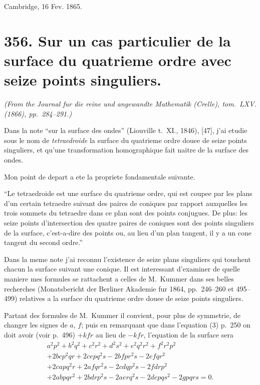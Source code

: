 \documentclass[11pt,a4paper]{article}
\theoremstyle{plain}
\begin{document}
\begin{flushright}
Cambridge, 16 Fev. 1865.
\end{flushright}

\vspace{1cm}

\section*{356. Sur un cas particulier de la surface du quatrieme ordre avec seize points singuliers.\quad [356]}
\label{sec:356}

\begin{flushright}
\textit{(From the Journal fur die reine und angewandte Mathematik (Crelle), tom.~LXV. (1866), pp.~284--291.)}
\end{flushright}

Dans la note ``sur la surface des ondes'' (Liouville t.~XI., 1846), [47], j'ai etudie sous le nom de \textit{tetraedroide} la surface du quatrieme ordre douee de seize points singuliers, et qu'une transformation homographique fait naitre de la surface des ondes.

Mon point de depart a ete la propriete fondamentale suivante.

``Le tetraedroide est une surface du quatrieme ordre, qui est coupee par les plans d'un certain tetraedre suivant des paires de coniques par rapport auxquelles les trois sommets du tetraedre dans ce plan sont des points conjugues. De plus: les seize points d'intersection des quatre paires de coniques sont des points singuliers de la surface, c'est-a-dire des points ou, au lieu d'un plan tangent, il y a un cone tangent du second ordre.''

Dans la meme note j'ai reconnu l'existence de seize plans singuliers qui touchent chacun la surface suivant une conique. Il est interessant d'examiner de quelle maniere mes formules se rattachent a celles de M.~Kummer dans ses belles recherches (Monatsbericht der Berliner Akademie fur 1864, pp.~246--260 et 495--499) relatives a la surface du quatrieme ordre douee de seize points singuliers.

Partant des formules de M.~Kummer il convient, pour plus de symmetrie, de changer les signes de $a$, $f$; puis en remarquant que dans l'equation (3) p.~250 on doit avoir (voir p.~496) $+kfr$ au lieu de $-kfr$, l'equation de la surface sera
\begin{multline*}
a^2p^2 + b^2q^2 + c^2r^2 + d^2s^2 + e^2q^2r^2 + f^2r^2p^2 \\
+ 2bcp^2qr + 2cepq^2s - 2bfpr^2s - 2efqr^2 \\
+ 2capq^2r + 2afqr^2s - 2cdqp^2s - 2fd rp^2 \\
+ 2abpqr^2 + 2bdrp^2s - 2aerq^2s - 2depqs^2 - 2gpqrs = 0.
\end{multline*}
\end{document}
